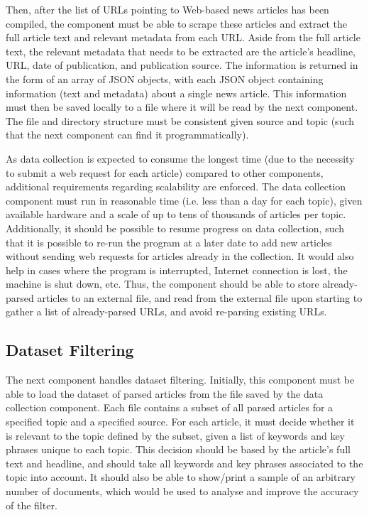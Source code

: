 \documentclass{report}
\begin{document}
Then, after the list of URLs pointing to Web-based news articles has been compiled, the component must be able to scrape these articles and extract the full article text and relevant metadata from each URL.
Aside from the full article text, the relevant metadata that needs to be extracted are the article's headline, URL, date of publication, and publication source.
The information is returned in the form of an array of JSON objects, with each JSON object containing information (text and metadata) about a single news article.
This information must then be saved locally to a file where it will be read by the next component. The file and directory structure must be consistent given source and topic (such that the next component can find it programmatically).

As data collection is expected to consume the longest time (due to the necessity to submit a web request for each article) compared to other components, additional requirements regarding scalability are enforced.
The data collection component must run in reasonable time (i.e. less than a day for each topic), given available hardware and a scale of up to tens of thousands of articles per topic.
Additionally, it should be possible to resume progress on data collection, such that it is possible to re-run the program at a later date to add new articles without sending web requests for articles already in the collection.
It would also help in cases where the program is interrupted, Internet connection is lost, the machine is shut down, etc.
Thus, the component should be able to store already-parsed articles to an external file, and read from the external file upon starting to gather a list of already-parsed URLs, and avoid re-parsing existing URLs.

\subsection{Dataset Filtering} \label{req-filtering}

The next component handles dataset filtering.
Initially, this component must be able to load the dataset of parsed articles from the file saved by the data collection component.
Each file contains a subset of all parsed articles for a specified topic and a specified source.
For each article, it must decide whether it is relevant to the topic defined by the subset, given a list of keywords and key phrases unique to each topic.
This decision should be based by the article's full text and headline, and should take all keywords and key phrases associated to the topic into account.
It should also be able to show/print a sample of an arbitrary number of documents, which would be used to analyse and improve the accuracy of the filter.
\end{document}

